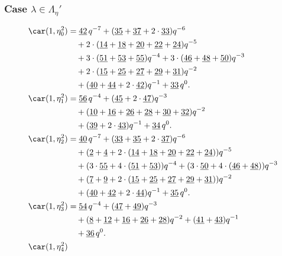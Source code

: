 \subsubsection{Case $\lambda\in \Lambda_\eta'$}

\begin{align*}
	\car(1,\eta^{2}_{0})
	&=\underline{42}\,q^{-7}+(\underline{35}+\underline{37}+2\cdot\underline{33})q^{-6}\\
	&\quad+2\cdot(\underline{14}+\underline{18}+\underline{20}+\underline{22}+\underline{24})q^{-5}\\
	&\quad+3\cdot(\underline{51}+\underline{53}+\underline{55})q^{-4}+3\cdot(\underline{46}+\underline{48}+\underline{50})q^{-3}\\
	&\quad+2\cdot(\underline{15}+\underline{25}+\underline{27}+\underline{29}+\underline{31})q^{-2}\\
	&\quad+(\underline{40}+\underline{44}+2\cdot\underline{42})q^{-1}+\underline{33}\,q^0.\\
	\car(1,\eta^{2}_{1})
	&=\underline{56}\,q^{-4}+(\underline{45}+2\cdot\underline{47})q^{-3}\\
	&\quad+(\underline{10}+\underline{16}+\underline{26}+\underline{28}+\underline{30}+\underline{32})q^{-2}\\
	&\quad+(\underline{39}+2\cdot\underline{43})q^{-1}+\underline{34}\,q^0.\\
	\car(1,\eta^{2}_{2})
	&=\underline{40}\,q^{-7}+(\underline{33}+\underline{35}+2\cdot\underline{37})q^{-6}\\
	&\quad+(\underline{2}+\underline{4}+2\cdot(\underline{14}+\underline{18}+\underline{20}+\underline{22}+\underline{24}))q^{-5}\\
	&\quad+(3\cdot\underline{55}+4\cdot(\underline{51}+\underline{53}))q^{-4}+(3\cdot\underline{50}+4\cdot(\underline{46}+\underline{48}))q^{-3}\\
	&\quad+(\underline{7}+\underline{9}+2\cdot(\underline{15}+\underline{25}+\underline{27}+\underline{29}+\underline{31}))q^{-2}\\
	&\quad+(\underline{40}+\underline{42}+2\cdot\underline{44})q^{-1}+\underline{35}\,q^0.\\
	\car(1,\eta^{2}_{3})
	&=\underline{54}\,q^{-4}+(\underline{47}+\underline{49})q^{-3}\\
	&\quad+(\underline{8}+\underline{12}+\underline{16}+\underline{26}+\underline{28})q^{-2}+(\underline{41}+\underline{43})q^{-1}\\
	&\quad+\underline{36}\,q^0.\\
	\car(1,\eta^{2}_{4})

\end{align*}
